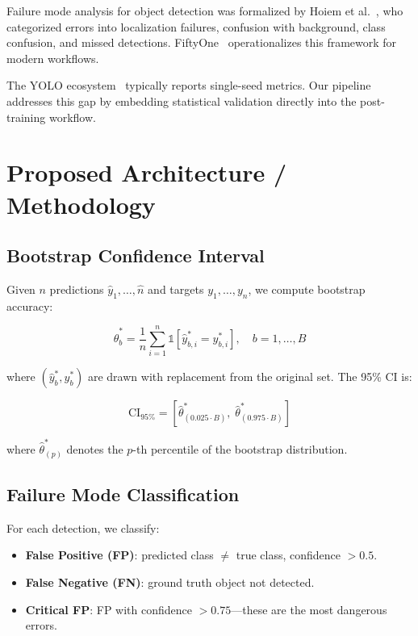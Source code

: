 \documentclass[10pt,twocolumn,letterpaper]{article}
\begin{document}
Failure mode analysis for object detection was formalized by Hoiem et al.~\cite{hoiem2012diagnostic}, who categorized errors into localization failures, confusion with background, class confusion, and missed detections. FiftyOne~\cite{fiftyone2024} operationalizes this framework for modern workflows.

The YOLO ecosystem~\cite{jocher2023yolo} typically reports single-seed metrics. Our pipeline addresses this gap by embedding statistical validation directly into the post-training workflow.

\section{Proposed Architecture / Methodology}

\subsection{Bootstrap Confidence Interval}
Given $n$ predictions $\hat{y}_1, \ldots, \hat{n}$ and targets $y_1, \ldots, y_n$, we compute bootstrap accuracy:

\begin{equation}
    \hat{\theta}^*_b = \frac{1}{n} \sum_{i=1}^{n} \mathbb{1}[\hat{y}^*_{b,i} = y^*_{b,i}], \quad b = 1, \ldots, B
\end{equation}

where $(\hat{y}^*_b, y^*_b)$ are drawn with replacement from the original set. The 95\% CI is:

\begin{equation}
    \text{CI}_{95\%} = \left[\hat{\theta}^*_{(0.025 \cdot B)}, \; \hat{\theta}^*_{(0.975 \cdot B)}\right]
\end{equation}

where $\hat{\theta}^*_{(p)}$ denotes the $p$-th percentile of the bootstrap distribution.

\subsection{Failure Mode Classification}
For each detection, we classify:

\begin{itemize}
    \item \textbf{False Positive (FP)}: predicted class $\neq$ true class, confidence $> 0.5$.
    \item \textbf{False Negative (FN)}: ground truth object not detected.
    \item \textbf{Critical FP}: FP with confidence $> 0.75$---these are the most dangerous errors.
\end{itemize}
\end{document}
